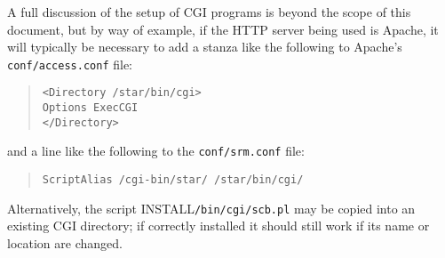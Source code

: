 \documentclass[twoside,11pt]{article}
\newcommand{\htmladdnormallink}[2]{#1}
\renewcommand{\_}{\texttt{\symbol{95}}}
\begin{document}
A full discussion of the setup of CGI programs is
beyond the scope of this document, but by way of example,
if the HTTP server being used is
\htmladdnormallink{Apache}{http://www.apache.org/},
it will typically
be necessary to
add a stanza like the following to Apache's {\tt conf/access.conf} file:
\begin{quote}
\begin{verbatim}
<Directory /star/bin/cgi>
Options ExecCGI
</Directory>
\end{verbatim}
\end{quote}
and a line like the following to the {\tt conf/srm.conf} file:
\begin{quote}
\begin{verbatim}
ScriptAlias /cgi-bin/star/ /star/bin/cgi/
\end{verbatim}
\end{quote}
Alternatively, the script INSTALL{\tt /bin/cgi/scb.pl} may be copied
into an existing CGI directory;
if correctly installed it should still work if its name or location
are changed.
\end{document}
